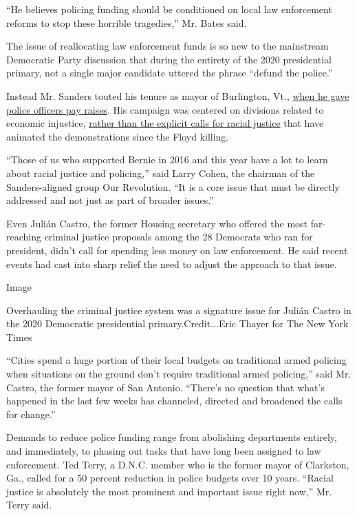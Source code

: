 ``He believes policing funding should be conditioned on local law
enforcement reforms to stop these horrible tragedies,'' Mr. Bates said.

The issue of reallocating law enforcement funds is so new to the
mainstream Democratic Party discussion that during the entirety of the
2020 presidential primary, not a single major candidate uttered the
phrase ``defund the police.''

Instead Mr. Sanders touted his tenure as mayor of Burlington, Vt.,
\href{https://www.nytimes.com/2015/11/26/us/politics/as-mayor-bernie-sanders-was-more-pragmatic-than-socialist.html}{when
he gave police officers pay raises}. His campaign was centered on
divisions related to economic injustice,
\href{https://www.nytimes.com/2020/06/19/us/politics/bernie-sanders-protests.html}{rather
than the explicit calls for racial justice} that have animated the
demonstrations since the Floyd killing.

``Those of us who supported Bernie in 2016 and this year have a lot to
learn about racial justice and policing,'' said Larry Cohen, the
chairman of the Sanders-aligned group Our Revolution. ``It is a core
issue that must be directly addressed and not just as part of broader
issues.''

Even Julián Castro, the former Housing secretary who offered the most
far-reaching criminal justice proposals among the 28 Democrats who ran
for president, didn't call for spending less money on law enforcement.
He said recent events had cast into sharp relief the need to adjust the
approach to that issue.

Image

Overhauling the criminal justice system was a signature issue for Julián
Castro in the 2020 Democratic presidential primary.Credit...Eric Thayer
for The New York Times

``Cities spend a huge portion of their local budgets on traditional
armed policing when situations on the ground don't require traditional
armed policing,'' said Mr. Castro, the former mayor of San Antonio.
``There's no question that what's happened in the last few weeks has
channeled, directed and broadened the calls for change.''

Demands to reduce police funding range from abolishing departments
entirely, and immediately, to phasing out tasks that have long been
assigned to law enforcement. Ted Terry, a D.N.C. member who is the
former mayor of Clarkston, Ga., called for a 50 percent reduction in
police budgets over 10 years. ``Racial justice is absolutely the most
prominent and important issue right now,'' Mr. Terry said.

